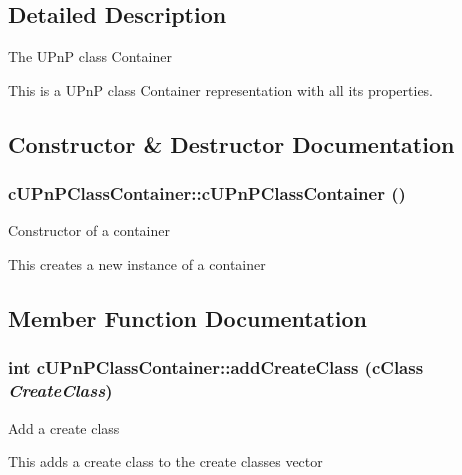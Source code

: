 \subsection{Detailed Description}
The UPnP class Container

This is a UPnP class Container representation with all its properties. 

\subsection{Constructor \& Destructor Documentation}
\hypertarget{classcUPnPClassContainer_e485882089f12f383ddbea26e186d851}{
\subsubsection[{cUPnPClassContainer}]{\setlength{\rightskip}{0pt plus 5cm}cUPnPClassContainer::cUPnPClassContainer ()}}
\label{classcUPnPClassContainer_e485882089f12f383ddbea26e186d851}


Constructor of a container

This creates a new instance of a container 

\subsection{Member Function Documentation}
\hypertarget{classcUPnPClassContainer_55613e5fa7019137aa818036e91a0811}{
\subsubsection[{addCreateClass}]{\setlength{\rightskip}{0pt plus 5cm}int cUPnPClassContainer::addCreateClass ({\bf cClass} {\em CreateClass})}}
\label{classcUPnPClassContainer_55613e5fa7019137aa818036e91a0811}


Add a create class

This adds a create class to the create classes vector

